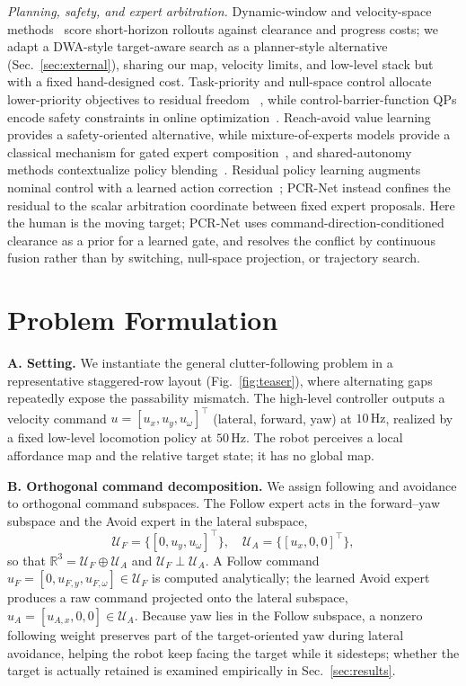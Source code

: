 \documentclass[letterpaper, 10 pt, conference]{ieeeconf}
\newcommand{\uF}{u_{F}}
\newcommand{\uA}{u_{A}}
\begin{document}
\emph{Planning, safety, and expert arbitration.}
Dynamic-window and velocity-space methods~\cite{ref:dwa} score
short-horizon rollouts against clearance and progress costs; we adapt a
DWA-style target-aware search as a planner-style alternative
(Sec.~\ref{sec:external}), sharing our map, velocity limits, and low-level
stack but with a fixed hand-designed cost. Task-priority and null-space
control allocate lower-priority objectives to residual freedom
~\cite{ref:taskpriority}, while control-barrier-function QPs encode safety
constraints in online optimization~\cite{ref:cbf}. Reach-avoid value
learning~\cite{ref:reachavoid} provides a safety-oriented alternative, while
mixture-of-experts models provide a classical mechanism for gated expert
composition~\cite{ref:moe}, and shared-autonomy methods contextualize policy
blending~\cite{ref:policyblend}. Residual policy learning augments nominal
control with a learned action correction~\cite{ref:residualrl}; PCR-Net instead
confines the residual to the scalar arbitration coordinate between fixed
expert proposals. Here the human is the moving target; PCR-Net uses
command-direction-conditioned clearance as a prior for a learned
gate, and resolves the conflict by continuous fusion rather than by switching,
null-space projection, or trajectory search.

\section{Problem Formulation}
\textbf{A. Setting.}
We instantiate the general clutter-following problem in a representative
staggered-row layout (Fig.~\ref{fig:teaser}), where alternating gaps
repeatedly expose the passability mismatch. The
high-level controller outputs a velocity command
$u=[u_x,u_y,u_\omega]^\top$ (lateral, forward, yaw) at $10\,\mathrm{Hz}$,
realized by a fixed low-level locomotion policy at $50\,\mathrm{Hz}$. The
robot perceives a local affordance map and the relative target state; it
has no global map.

\textbf{B. Orthogonal command decomposition.}
We assign following and avoidance to orthogonal command subspaces. The
Follow expert acts in the forward--yaw subspace and the Avoid expert in
the lateral subspace,
\begin{equation}
\mathcal{U}_F=\{[0,u_y,u_\omega]^\top\},\quad
\mathcal{U}_A=\{[u_x,0,0]^\top\},
\end{equation}
so that $\mathbb{R}^3=\mathcal{U}_F\oplus\mathcal{U}_A$ and
$\mathcal{U}_F\perp\mathcal{U}_A$. A Follow command
$\uF=[0,u_{F,y},u_{F,\omega}]\in\mathcal{U}_F$ is computed analytically;
the learned Avoid expert produces a raw command projected onto the
lateral subspace, $\uA=[u_{A,x},0,0]\in\mathcal{U}_A$. Because yaw lies in
the Follow subspace, a nonzero following weight preserves part of the
target-oriented yaw during lateral avoidance, helping the robot keep facing
the target while it sidesteps; whether the target is actually retained is
examined empirically in Sec.~\ref{sec:results}.
\end{document}
